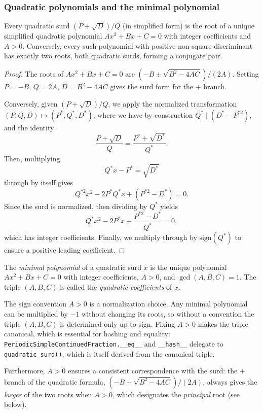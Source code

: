 \subsubsection{Quadratic polynomials and the minimal polynomial}

\begin{lemma}
  \label{lem:surd-poly}
  Every quadratic surd $(P + \sqrt{D})/Q$ (in simplified form) is the root of a unique
  simplified quadratic polynomial $Ax^2 + Bx + C = 0$ with integer coefficients and $A > 0$.
  Conversely, every such polynomial with positive non-square discriminant has exactly two roots,
  both quadratic surds, forming a conjugate pair.
\end{lemma}

\begin{proof}
  The roots of $Ax^2 + Bx + C = 0$ are $(-B \pm \sqrt{B^2 - 4AC})/(2A)$.  Setting $P = -B$,
  $Q = 2A$, $D = B^2 - 4AC$ gives the surd form for the $+$ branch.

  Conversely, given $(P + \sqrt{D})/Q$, we apply the normalized transformation $(P, Q, D) \mapsto (P^*, Q^*, D^*)$, where we have
  by construction $Q^* \mid (D^* - P^{*2})$, and the identity
  \[
    \frac{P + \sqrt{D}}{Q} = \frac{P^* + \sqrt{D^*}}{Q^*}.
  \]
  Then, multiplying
  \[
  Q^*x - P^* = \sqrt{D^*}
  \]
  through by itself gives
  \[
  Q^{*2}x^2 - 2P^*Q^*x + (P^{*2} - D^*) = 0.
  \]
  Since the surd is normalized, then dividing by $Q^*$
  yields
  \[
  Q^*x^2 - 2P^*x + \frac{P^{*2}-D^*}{Q^{*}} = 0,
  \]
  which has integer coefficients. Finally, we multiply through by $\text{sign}(Q^*)$ to ensure a positive leading coefficient.
\end{proof}

\begin{definition}
  \label{def:quadratic-coefficients}
  The \emph{minimal polynomial} of a quadratic surd $x$ is the unique polynomial
  $Ax^2 + Bx + C = 0$ with integer coefficients, $A > 0$, and $\gcd(A, B, C) = 1$.
  The triple $(A, B, C)$ is called the \emph{quadratic coefficients} of $x$.
\end{definition}

\begin{remark}[Why $A > 0$]
  The sign convention $A > 0$ is a normalization choice.  Any minimal polynomial can be
  multiplied by $-1$ without changing its roots, so without a convention the triple $(A, B, C)$
  is determined only up to sign.  Fixing $A > 0$ makes the triple canonical, which is essential
  for hashing and equality: \texttt{PeriodicSimpleContinuedFraction.\_\_eq\_\_} and
  \texttt{\_\_hash\_\_} delegate to \texttt{quadratic\_surd()}, which is itself derived from the
  canonical triple.

  Furthermore, $A > 0$ ensures a consistent correspondence with the surd: the $+$ branch of the
  quadratic formula, $(-B + \sqrt{B^2 - 4AC})/(2A)$, always gives the \emph{larger} of the two
  roots when $A > 0$, which \catena designates the \emph{principal} root (see below).
\end{remark}

